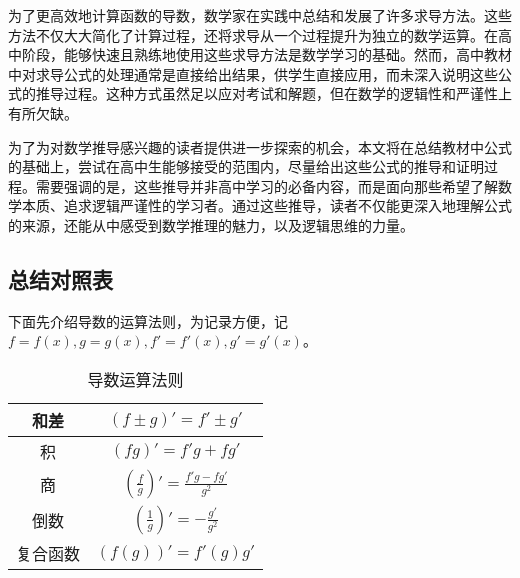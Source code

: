 
\begin{issues}
\issueDraft
\end{issues}


为了更高效地计算函数的导数，数学家在实践中总结和发展了许多求导方法。这些方法不仅大大简化了计算过程，还将求导从一个过程提升为独立的数学运算。在高中阶段，能够快速且熟练地使用这些求导方法是数学学习的基础。然而，高中教材中对求导公式的处理通常是直接给出结果，供学生直接应用，而未深入说明这些公式的推导过程。这种方式虽然足以应对考试和解题，但在数学的逻辑性和严谨性上有所欠缺。

为了为对数学推导感兴趣的读者提供进一步探索的机会，本文将在总结教材中公式的基础上，尝试在高中生能够接受的范围内，尽量给出这些公式的推导和证明过程。需要强调的是，这些推导并非高中学习的必备内容，而是面向那些希望了解数学本质、追求逻辑严谨性的学习者。通过这些推导，读者不仅能更深入地理解公式的来源，还能从中感受到数学推理的魅力，以及逻辑思维的力量。

\subsection{总结对照表}

下面先介绍导数的运算法则，为记录方便，记$f=f(x),g=g(x),f'=f'(x),g'=g'(x)$。
\begin{table}[ht]
\centering
\caption{导数运算法则}\label{tab_HsDerB1}
\begin{tabular}{|c|c|}
\hline
和差 & $(f\pm g)'=f'\pm g'$ \\
\hline
积 & $(fg)'=f'g+fg'$ \\
\hline
商 & $\displaystyle\left(\frac{f}{g}\right)'=\frac{f'g-fg'}{g^2}$ \\
\hline
倒数 & $\displaystyle\left(\frac{1}{g}\right)'=-\frac{g'}{g^2}$ \\
\hline
复合函数 & $(f(g))'=f'(g)g'$ \\
\hline
\end{tabular}
\end{table}

